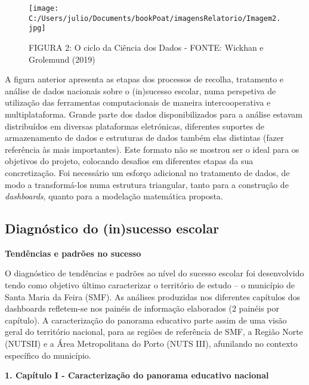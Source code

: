 \documentclass[
]{book}
\begin{document}
\begin{figure}
\centering
\texttt{[image: C:/Users/julio/Documents/bookPoat/imagensRelatorio/Imagem2.jpg]}
\caption{FIGURA 2: O ciclo da Ciência dos Dados - FONTE: Wickhan e Grolemund (2019)}
\end{figure}

A figura anterior apresenta as etapas dos processos de recolha, tratamento e análise de dados nacionais sobre o (in)sucesso escolar, numa perspetiva de utilização das ferramentas computacionais de maneira intercooperativa e multiplataforma. Grande parte dos dados disponibilizados para a análise estavam distribuídos em diversas plataformas eletrónicas, diferentes suportes de armazenamento de dados e estruturas de dados também elas distintas (fazer referência às mais importantes). Este formato não se mostrou ser o ideal para os objetivos do projeto, colocando desafios em diferentes etapas da sua concretização. Foi necessário um esforço adicional no tratamento de dados, de modo a transformá-los numa estrutura triangular, tanto para a construção de \emph{dashboards}, quanto para a modelação matemática proposta.

\hypertarget{diagnuxf3stico-do-insucesso-escolar}{%
\subsection{Diagnóstico do (in)sucesso escolar}\label{diagnuxf3stico-do-insucesso-escolar}}

\textbf{Tendências e padrões no sucesso}

O diagnóstico de tendências e padrões ao nível do sucesso escolar foi desenvolvido tendo como objetivo último caracterizar o território de estudo -- o município de Santa Maria da Feira (SMF). As análises produzidas nos diferentes capítulos dos dashboards refletem-se nos painéis de informação elaborados (2 painéis por capítulo). A caracterização do panorama educativo parte assim de uma visão geral do território nacional, para as regiões de referência de SMF, a Região Norte (NUTSII) e a Área Metropolitana do Porto (NUTS III), afunilando no contexto específico do município.

\textbf{1. Capítulo I - Caracterização do panorama educativo nacional}
\end{document}
